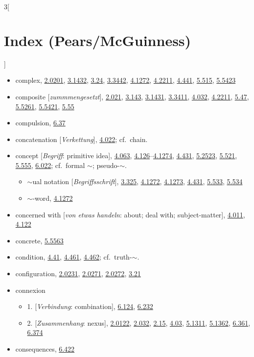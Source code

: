 \documentclass[oneside,openany,12pt]{book}
\newcommand{\indexentry}[1]{\item #1}
\newcommand{\indexsubentry}[1]{\begin{itemize} \item #1 \end{itemize}}
\newcommand{\indexref}[1]{\hyperlink{prop#1}{#1}}
\begin{document}
\begin{multicols}{3}[\section*{Index (Pears/McGuinness)}]
\begin{itemize}
   \indexsubentry{analyse $\sim$ly, \indexref{3.201}, \indexref{3.25};}

   \indexsubentry{describe $\sim$ly, \indexref{2.0201}, \indexref{4.023}, \indexref{4.26}, \indexref{5.526}, \indexref{6.342}}

\indexentry{complex, \indexref{2.0201}, \indexref{3.1432}, \indexref{3.24}, \indexref{3.3442}, \indexref{4.1272}, \indexref{4.2211}, \indexref{4.441}, \indexref{5.515}, \indexref{5.5423}}

\indexentry{composite [\textit{zummmengesetzt}], \indexref{2.021}, \indexref{3.143}, \indexref{3.1431}, \indexref{3.3411}, \indexref{4.032}, \indexref{4.2211}, \indexref{5.47}, \indexref{5.5261}, \indexref{5.5421}, \indexref{5.55}}

\indexentry{compulsion, \indexref{6.37}}

\indexentry{concatenation [\textit{Verkettung}], \indexref{4.022}; cf.\ chain.}

\indexentry{concept [\textit{Begriff}: primitive idea], \indexref{4.063}, \indexref{4.126}--\indexref{4.1274}, \indexref{4.431}, \indexref{5.2523}, \indexref{5.521}, \indexref{5.555}, \indexref{6.022}; cf.\ formal $\sim$; pseudo-$\sim$.}

   \indexsubentry{$\sim$ual notation [\textit{Begriffsschrift}], \indexref{3.325}, \indexref{4.1272}, \indexref{4.1273}, \indexref{4.431}, \indexref{5.533}, \indexref{5.534}}

   \indexsubentry{$\sim$-word, \indexref{4.1272}}

\indexentry{concerned with [\textit{von etwas handeln}: about; deal with; subject-matter], \indexref{4.011}, \indexref{4.122}}

\indexentry{concrete, \indexref{5.5563}}

\indexentry{condition, \indexref{4.41}, \indexref{4.461}, \indexref{4.462}; cf.\ truth-$\sim$.}

\indexentry{configuration, \indexref{2.0231}, \indexref{2.0271}, \indexref{2.0272}, \indexref{3.21}}

\indexentry{connexion}

   \indexsubentry{1. [\textit{Verbindung}: combination], \indexref{6.124}, \indexref{6.232}}

   \indexsubentry{2. [\textit{Zusammenhang}: nexus], \indexref{2.0122}, \indexref{2.032}, \indexref{2.15}, \indexref{4.03}, \indexref{5.1311}, \indexref{5.1362}, \indexref{6.361}, \indexref{6.374}}

\indexentry{consequences, \indexref{6.422}}


\end{itemize}
\end{multicols}
\end{document}
